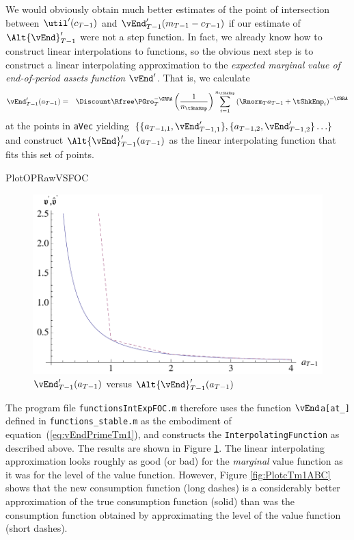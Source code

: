 \documentclass[titlepage]{\econtex}
\begin{document}
We would obviously obtain much better estimates of the point of
intersection between $\util^{\prime}({c}_{T-1})$ and
$\vEnd_{T-1}^{\prime}({m}_{T-1}-{c}_{T-1})$ if our estimate of
$\Alt{\vEnd}^{\prime}_{T-1}$ were not a step function.  In
fact, we already know how to construct linear interpolations
to functions, so the obvious next step is to construct a
linear interpolating approximation to the \textit{expected marginal
  value of end-of-period assets function} $\vEnd^{\prime}$. That is, we calculate
\begin{eqnarray}
  \vEnd_{T-1}^{\prime}({a}_{T-1}) & = &  \Discount \Rfree \PGro_{T}^{-\CRRA} \left(\frac{1}{n_{\tShkEmp}}\right) \sum_{i=1}^{n_{\tShkEmp}} \left(\Rnorm_{T} {a}_{T-1} + \tShkEmp_{i}\right)^{-\CRRA} \label{eq:vEndPrimeTm1}
\end{eqnarray}
at the points in \texttt{aVec} yielding
$\{\{\null{a}_{T-1,1},\vEnd_{T-1,1}^{\prime}\},\{{a}_{T-1,2},\vEnd_{T-1,2}^{\prime}\}
\ldots\}$ and construct
$\Alt{\vEnd}_{T-1}^{\prime}({a}_{T-1})$ as the linear
interpolating function that fits this set of points.

\hypertarget{}{PlotOPRawVSFOC}{}
\begin{figure}
  \includegraphics{./Figures/PlotOPRawVSFOC}
  \caption{$\vEnd_{T-1}^{\prime}({a}_{T-1})$ versus $\Alt{\vEnd}_{T-1}^{\prime}({a}_{T-1})$}
  \label{fig:PlotOPRawVSFOC}
\end{figure}


The program file \texttt{functionsIntExpFOC.m} therefore
uses the function \texttt{$\vEnd$a[at\_]} defined in \texttt{functions\_stable.m}
as the embodiment of equation~(\ref{eq:vEndPrimeTm1}), and constructs the
\texttt{InterpolatingFunction} as described above.  The results are
shown in Figure \ref{fig:PlotOPRawVSFOC}.  The linear
interpolating approximation looks roughly as good (or bad) for the
\textit{marginal} value function as it was for the level of the value
function. However, Figure \ref{fig:PlotcTm1ABC} shows that the new
consumption function (long dashes) is a considerably better
approximation of the true consumption function (solid) than was the
consumption function obtained by approximating the level of the
value function (short dashes).
\end{document}
